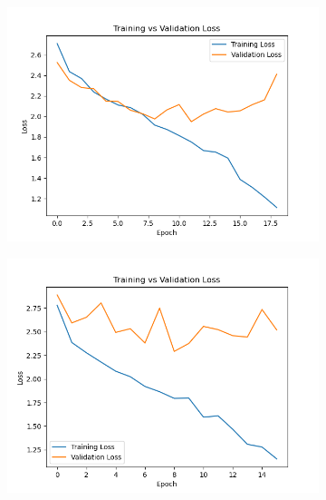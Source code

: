 \documentclass{article}
\begin{document}
    \begin{figure}[H]
      \centering
      \begin{subfigure}[b]{0.45\textwidth}
        \centering
        \includegraphics[width=\textwidth]{figures/loss_curve_1.png}
        \caption{}
        \label{fig:loss_curve_1}
      \end{subfigure}
      \hfill
      \begin{subfigure}[b]{0.45\textwidth}
        \centering
        \includegraphics[width=\textwidth]{figures/loss_curve_2.png}
        \caption{}
        \label{fig:loss_curve_2}
      \end{subfigure}
      
      \vspace{0.5em}
      

\end{figure}
\end{document}

